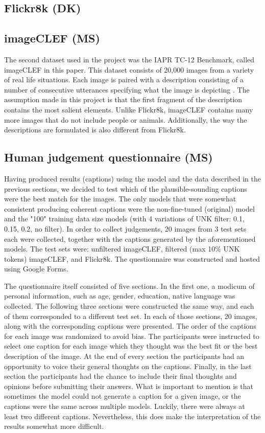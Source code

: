 \documentclass[11pt]{article}
\begin{document}
\subsection{Flickr8k (DK)}
\subsection{imageCLEF (MS)}

The second dataset used in the project was the IAPR TC-12 Benchmark, called imageCLEF in this paper. This dataset consists of 20,000 images from a variety of real life situations. Each image is paired with a description consisting of a number of consecutive utterances specifying what the image is depicting \cite{imageclef}. The assumption made in this project is that the first fragment of the description contains the most salient elements. Unlike Flickr8k, imageCLEF contains many more images that do not include people or animals. Additionally, the way the descriptions are formulated is also different from Flickr8k.

\subsection{Human judgement questionnaire (MS)}

Having produced results (captions) using the model and the data described in the previous sections, we decided to test which of the plausible-sounding captions were the best match for the images. The only models that were somewhat consistent producing coherent captions were the non-fine-tuned (original) model and the "100" training data size models (with 4 variations of UNK filter: 0.1, 0.15, 0.2, no filter). In order to collect judgements, 20 images from 3 test sets each were collected, together with the captions generated by the aforementioned models. The test sets were: unfiltered imageCLEF, filtered (max 10\% UNK tokens) imageCLEF, and Flickr8k. The questionnaire was constructed and hosted using Google Forms.

The questionnaire itself consisted of five sections. In the first one, a modicum of personal information, such as age, gender, education, native language was collected. The following three sections were constructed the same way, and each of them corresponded to a different test set. In each of those sections, 20 images, along with the corresponding captions were presented. The order of the captions for each image was randomized to avoid bias. The participants were instructed to select one caption for each image which they thought was the best fit or the best description of the image. At the end of every section the participants had an opportunity to voice their general thoughts on the captions. Finally, in the last section the participants had the chance to include their final thoughts and opinions before submitting their answers. What is important to mention is that sometimes the model could not generate a caption for a given image, or the captions were the same across multiple models. Luckily, there were always at least two different captions. Nevertheless, this does make the interpretation of the results somewhat more difficult.
\end{document}
